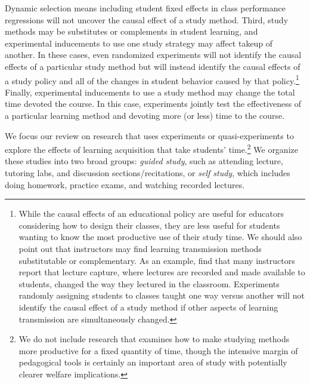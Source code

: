 \documentclass[12pt]{article}
\begin{document}
Dynamic selection means including student fixed effects in class performance regressions will not uncover the causal effect of a study method. Third, study methods may be substitutes or complements in student learning, and experimental inducements to use one study strategy may affect takeup of another. In these cases, even randomized experiments will not identify the causal effects of a particular study method but will instead identify the causal effects of a study policy and all of the changes in student behavior caused by that policy.\footnote{While the causal effects of an educational policy are useful for educators considering how to design their classes, they are less useful for students wanting to know the most productive use of their study time. We should also point out that instructors may find learning transmission methods substitutable or complementary. As an example, \textcite{msc2019} find that many instructors report that lecture capture, where lectures are recorded and made available to students, changed the way they lectured in the classroom. Experiments randomly assigning students to classes taught one way versus another will not identify the causal effect of a study method if other aspects of learning transmission are simultaneously changed.} %
Finally, experimental inducements to use a study method may change the total time devoted the course. In this case, experiments jointly test the effectiveness of a particular learning method and devoting more (or less) time to the course.


We focus our review on research that uses experiments or quasi-experiments to explore the effects of learning acquisition that take students' time.\footnote{We do not include research that examines how to make studying methods more productive for a fixed quantity of time, though the intensive margin of pedagogical tools is certainly an important area of study with potentially clearer welfare implications.} We organize these studies into two broad groups: \textit{guided study}, such as attending lecture, tutoring labs, and discussion sections/recitations, or \textit{self study}, which includes doing homework, practice exams, and watching recorded lectures.
\end{document}
